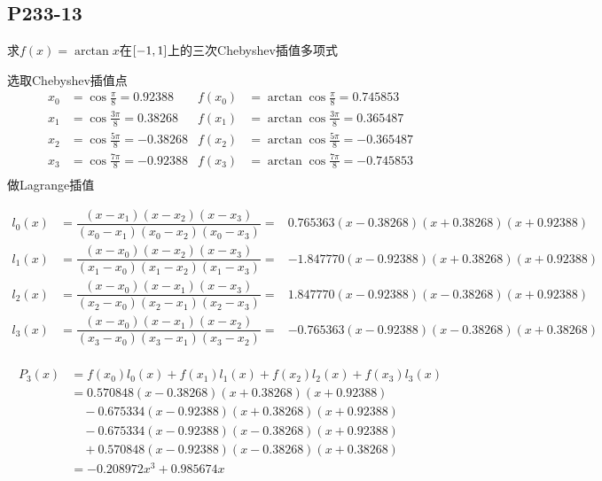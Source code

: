 \subsection{P233-13}
\renewcommand{\FX}{\arctan x}
\renewcommand{\LRANGE}{-1}
\renewcommand{\RRANGE}{1}
求$f(x) = \FX$在$\RANGE$上的三次Chebyshev插值多项式
\begin{SOLVE}
选取Chebyshev插值点
\begin{align*}
x_0 & = \cos\frac{ \pi}{8} =  0.92388 & f(x_0) & = \arctan\cos\frac{ \pi}{8} =  0.745853 \\
x_1 & = \cos\frac{3\pi}{8} =  0.38268 & f(x_1) & = \arctan\cos\frac{3\pi}{8} =  0.365487 \\
x_2 & = \cos\frac{5\pi}{8} = -0.38268 & f(x_2) & = \arctan\cos\frac{5\pi}{8} = -0.365487 \\
x_3 & = \cos\frac{7\pi}{8} = -0.92388 & f(x_3) & = \arctan\cos\frac{7\pi}{8} = -0.745853 \\
\end{align*}
做Lagrange插值

\newcommand{\LAGRANGE}[5]{\dfrac{(#1#3)(#1#4)(#1#5)}{(#2#3)(#2#4)(#2#5)}}

\begin{equation*}
\begin{array}{rcl}
l_0(x) & = \LAGRANGE{x}{x_0}{-x_1}{-x_2}{-x_3}
       = &  0.765363 (x - 0.38268) (x + 0.38268) (x + 0.92388) \\
l_1(x) & = \LAGRANGE{x}{x_1}{-x_0}{-x_2}{-x_3}
       = & -1.847770 (x - 0.92388) (x + 0.38268) (x + 0.92388) \\
l_2(x) & = \LAGRANGE{x}{x_2}{-x_0}{-x_1}{-x_3}
       = &  1.847770 (x - 0.92388) (x - 0.38268) (x + 0.92388) \\
l_3(x) & = \LAGRANGE{x}{x_3}{-x_0}{-x_1}{-x_2}
       = & -0.765363 (x - 0.92388) (x - 0.38268) (x + 0.38268) \\
\end{array}
\end{equation*}

\begin{align*}
P_3(x) & = f(x_0) l_0(x) + f(x_1) l_1(x) + f(x_2) l_2(x) + f(x_3) l_3(x) \\
       & =  0.570848 (x - 0.38268) (x + 0.38268) (x + 0.92388) \\
       & \quad -0.675334 (x - 0.92388) (x + 0.38268) (x + 0.92388) \\
       & \quad -0.675334 (x - 0.92388) (x - 0.38268) (x + 0.92388) \\
       & \quad +0.570848 (x - 0.92388) (x - 0.38268) (x + 0.38268) \\
       & = - 0.208972 x^3 + 0.985674 x \\
\end{align*}
\end{SOLVE}